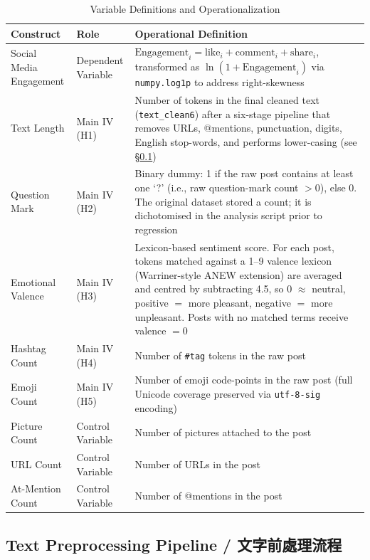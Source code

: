 \documentclass[12pt,a4paper,fontset=none]{ctexart}
\begin{document}
\begin{table}[H]
\centering
\caption{Variable Definitions and Operationalization}
\small
\begin{tabular}{@{}p{} p{} p{}@{}}
\toprule
Construct & Role & Operational Definition \\
\midrule
Social Media Engagement & Dependent Variable & $\text{Engagement}_i = \text{like}_i + \text{comment}_i + \text{share}_i$, transformed as $\ln(1+\text{Engagement}_i)$ via \texttt{numpy.log1p} to address right-skewness \\
\midrule
Text Length & Main IV (H1) & Number of tokens in the final cleaned text (\texttt{text\_clean6}) after a six-stage pipeline that removes URLs, @mentions, punctuation, digits, English stop-words, and performs lower-casing (see §\ref{sec:preproc}) \\
Question Mark & Main IV (H2) & Binary dummy: 1 if the raw post contains at least one `?' (i.e., raw question-mark count $>0$), else 0. The original dataset stored a count; it is dichotomised in the analysis script prior to regression \\
Emotional Valence & Main IV (H3) & Lexicon-based sentiment score. For each post, tokens matched against a 1--9 valence lexicon (Warriner-style ANEW extension) are averaged and centred by subtracting 4.5, so 0 $\approx$ neutral, positive $=$ more pleasant, negative $=$ more unpleasant. Posts with no matched terms receive valence $= 0$ \\
Hashtag Count & Main IV (H4) & Number of \texttt{\#tag} tokens in the raw post \\
Emoji Count & Main IV (H5) & Number of emoji code-points in the raw post (full Unicode coverage preserved via \texttt{utf-8-sig} encoding) \\
\midrule
Picture Count & Control Variable & Number of pictures attached to the post \\
URL Count & Control Variable & Number of URLs in the post \\
At-Mention Count & Control Variable & Number of @mentions in the post \\
\bottomrule
\end{tabular}
\end{table}

\subsection{Text Preprocessing Pipeline / 文字前處理流程}
\label{sec:preproc}
\end{document}
